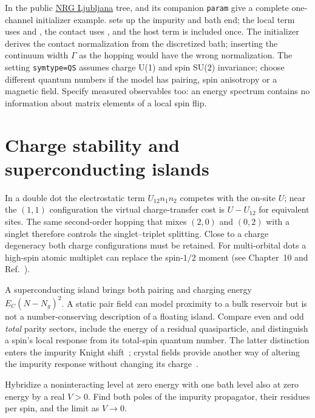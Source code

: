 In the public \href{https://github.com/rokzitko/nrgljubljana}{NRG Ljubljana}
tree,  and its companion
\texttt{param} give a complete one-channel initializer example.
 sets up the impurity and bath end; the local term uses
 and , the contact uses
, and the host term is included once. The initializer
derives the contact normalization from the discretized bath; inserting
the continuum width $\Gamma$ as the hopping would have the wrong
normalization. The setting \texttt{symtype=QS} assumes charge U(1) and
spin SU(2) invariance; choose different
quantum numbers if the model has pairing, spin anisotropy or a magnetic
field. Specify measured observables too: an energy spectrum contains
no information about matrix elements of a local spin flip.

\section{Charge stability and superconducting islands}
In a double dot the electrostatic term $U_{12}n_1 n_2$ competes
with the on-site $U$; near the $(1,1)$ configuration the virtual
charge-transfer cost is $U-U_{12}$ for equivalent sites. The same
second-order hopping that mixes $(2,0)$ and $(0,2)$ with a singlet
therefore controls the singlet--triplet splitting. Close to a charge
degeneracy both charge configurations must be retained.
For multi-orbital dots a high-spin atomic multiplet can replace the
spin-$1/2$ moment (see Chapter~10 and Ref.~\cite{horvat}).

A superconducting island brings both pairing and charging energy
$E_C(N-N_g)^2$. A static pair field can model proximity to a bulk
reservoir but is not a number-conserving description of a floating
island. Compare even and odd \emph{total} parity sectors, include
the energy of a residual quasiparticle, and distinguish a spin's
local response from its total-spin quantum number. The latter
distinction enters the impurity Knight shift~\cite{pavesic-knight};
crystal fields provide another way of altering the impurity response
without changing its charge~\cite{zitko-anisotropic}.
\begin{exercise}\label{ex:resonance}
Hybridize a noninteracting level at zero energy with one bath level
also at zero energy by a real $V>0$. Find both poles of the impurity
propagator, their residues per spin, and the limit as $V\to0$.
\end{exercise}
